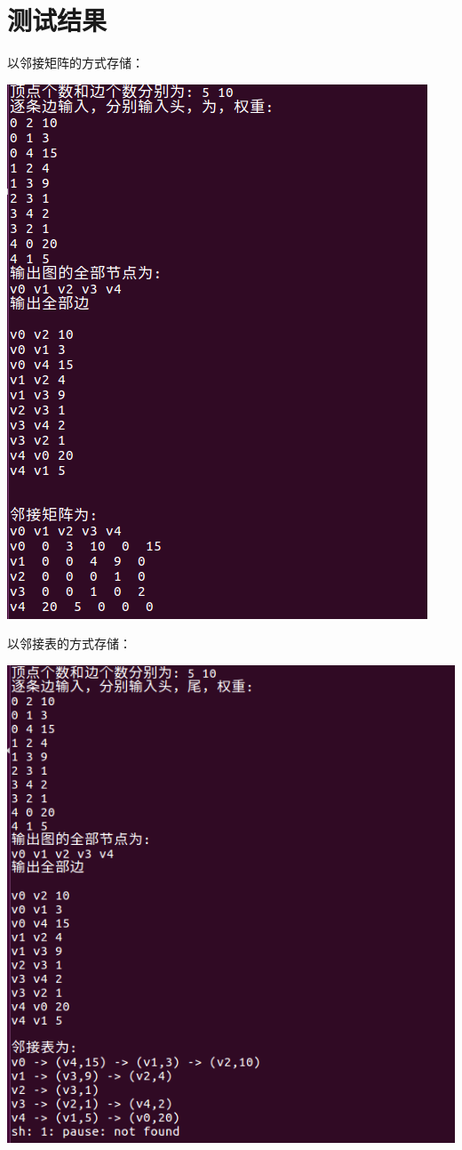 \documentclass{ctexart}
\begin{document}
\section{测试结果}
以邻接矩阵的方式存储：
\begin{center}
  \includegraphics[scale=0.6]{ss2.png}
  \hspace{0.1in}
\end{center}
以邻接表的方式存储：
\begin{center}
  \includegraphics[scale=0.5]{ss3.png}
  \hspace{0.1in}
\end{center}
\end{document}
